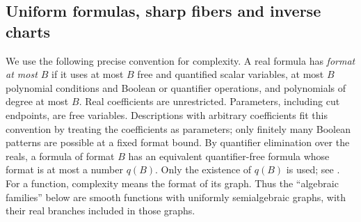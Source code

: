 \documentclass[11pt,a4paper]{article}
\numberwithin{equation}{section}
\theoremstyle{remark}
\begin{document}
\subsection{Uniform formulas, sharp fibers and inverse charts}

We use the following precise convention for complexity. A real formula has
\emph{format at most $B$} if it uses at most $B$ free and quantified scalar
variables, at most $B$ polynomial conditions and Boolean or quantifier
operations, and polynomials of degree at most $B$. Real coefficients are
unrestricted. Parameters, including cut endpoints, are free variables.
Descriptions with arbitrary coefficients fit this convention by treating
the coefficients as parameters; only finitely many Boolean patterns are
possible at a fixed format bound.
By quantifier elimination over the reals, a formula of format $B$ has an
equivalent quantifier-free formula whose format is at most a number $q(B)$.
Only the existence of $q(B)$ is used; see \cite[Section~2]{Basu}.
For a function, complexity means the format of its graph. Thus the
``algebraic families'' below are smooth functions with uniformly
semialgebraic graphs, with their real branches included in those graphs.
\end{document}

